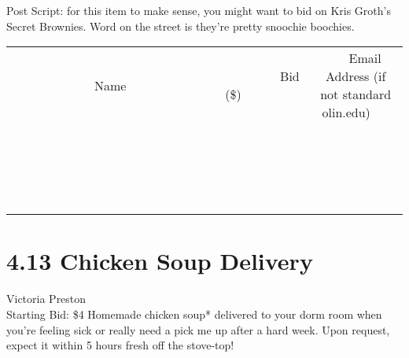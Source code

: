 \documentclass[11pt]{article}
\begin{document}
Post Script: for this item to make sense, you might want to bid on Kris Groth's Secret Brownies. Word on the street is they're pretty snoochie boochies.
\\[3ex]
\begin{tabular}{c c c}
~~~~~~~~~~~~~Name~~~~~~~~~~~~~ & ~~~~~~~~~Bid (\$)~~~~~~~~~  & ~~~Email Address (if not standard olin.edu)~~~\\
 & & \\
\hline
 & & \\
\hline
 & & \\
\hline
 & & \\
\hline
 & & \\
\hline
 & & \\
\hline
 & & \\
\hline
 & & \\
\hline
 & & \\
\hline
 & & \\
\hline
 & & \\
\hline
 & & \\
\hline
 & & \\
\hline
 & & \\
\hline
 & & \\
\hline
 & & \\
\hline
 & & \\
\hline
 & & \\
\hline
 & & \\
\hline
\end{tabular}
\newpage
\section*{4.13 Chicken Soup Delivery}
Victoria Preston
\\
Starting Bid: \$4
\newline
Homemade chicken soup* delivered to your dorm room when you're feeling sick or really need a pick me up after a hard week.  Upon request, expect it within 5 hours fresh off the stove-top!
\end{document}
